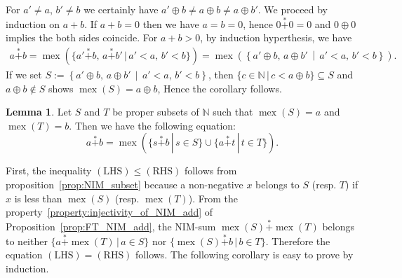 \documentclass[a4paper,11pt]{amsart}
\theoremstyle{definition}
\newtheorem{lem}{Lemma}[section]
\newenvironment{demo}[1]{%
  \trivlist
  \item[\hskip\labelsep
        {\bf #1.}]
}{%
\hfill\qedsymbol
  \endtrivlist
}
\newcommand{\mex}{\operatorname{mex}}
\newcommand{\nimadd}{\overset{*}{+}}
\numberwithin{equation}{section}
\def\Non{\mathbb{N}}
\begin{document}
%
\begin{demo}{Proof}
%
For $a'\neq a$, $b'\neq b$ we certainly have $a'\oplus b\neq a\oplus b \neq a\oplus b'$.
We proceed by induction on $a+b$.
If $a+b=0$ then we have $a=b=0$,
hence $0\nimadd 0=0$ and $0\oplus 0$ implies the both sides coincide.
For $a+b>0$, by induction hyperthesis, we have
%
\begin{align*}
a\nimadd b
=\mex(\{ a'\nimadd b,\, a\nimadd b' \,|\, a'<a,\, b'<b \} )
=\mex\left(\left\{a'\oplus b,\, a\oplus b' \,\middle|\, a'<a,\, b'<b\right\} \right).
\end{align*}
%
If we set $S:=\left\{a'\oplus b,\, a\oplus b' \,\middle|\, a'<a,\, b'<b\right\}$,
then $\{c\in\Non \,|\, c<a\oplus b\}\subseteq S$ and $a\oplus b\not\in S$ shows $\mex(S)=a\oplus b$,
Hence the corollary follows.
%
\end{demo}
%
\begin{lem}\label{lemma:NIM_add_and_mex}
	Let $S$ and $T$ be proper subsets of $\Non$ such that $\mex(S)=a$ and $\mex(T)=b$.
	Then we have the following equation:
	\begin{equation*}
		a \nimadd b
		=
		\mex(
			\{ s \nimadd b \, | \, s \in S \}
			\cup
			\{ a \nimadd t \, | \, t \in T \}
		).
	\end{equation*}
\end{lem}
%
\begin{demo}{Proof}
	First,
	the inequality
	$(\textrm{LHS}) \leq (\textrm{RHS})$
	follows from proposition~\ref{prop:NIM_subset}
	because
	a non-negative $x$ belongs to $S$ (resp. $T$)
	if $x$ is less than $\mex(S)$ (resp. $\mex(T)$).
	From the property~\eqref{property:injectivity_of_NIM_add} 
	of Proposition~\ref{prop:FT_NIM_add},
	the NIM-sum
	$\mex(S) \nimadd \mex(T)$ belongs to
	neither
	$\{ a \nimadd \mex(T) \, | \, a \in S \}$
	nor
	$\{ \mex(S) \nimadd b \, | \, b \in T \}$.
	Therefore
	the equation
	$(\textrm{LHS}) = (\textrm{RHS})$
	follows.
\end{demo}
%
The following corollary is easy to prove by induction.
\end{document}
